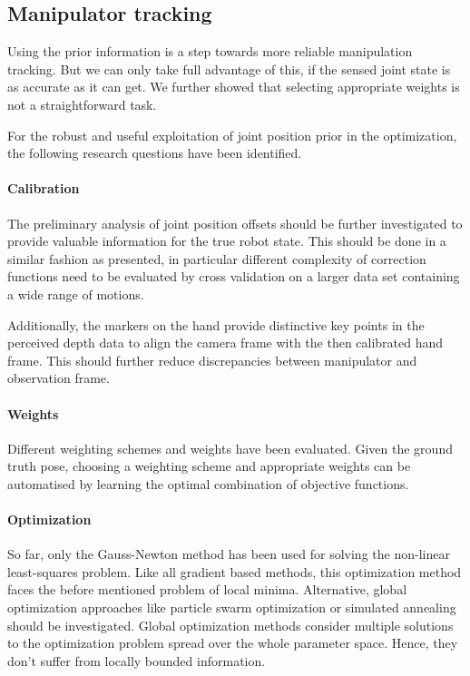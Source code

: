 \subsection{Manipulator tracking}

Using the prior information is a step towards more reliable manipulation tracking. But we can only take full advantage of this, if the sensed joint state is as accurate as it can get. We further showed that selecting appropriate weights is not a straightforward task.

For the robust and useful exploitation of joint position prior in the optimization, the following research questions have been identified.

\paragraph{Calibration}
The preliminary analysis of joint position offsets should be further investigated to provide valuable information for the true robot state. This should be done in a similar fashion as presented, in particular different complexity of correction functions need to be evaluated by cross validation on a larger data set containing a wide range of motions.

Additionally, the markers on the hand provide distinctive key points in the perceived depth data to align the camera frame with the then calibrated hand frame. This should further reduce discrepancies between manipulator and observation frame.

\paragraph{Weights}
Different weighting schemes and weights have been evaluated. Given the ground truth pose, choosing a weighting scheme and appropriate weights can be automatised by learning the optimal combination of objective functions.

\paragraph{Optimization}
So far, only the Gauss-Newton method has been used for solving the non-linear least-squares problem. Like all gradient based methods, this optimization method faces the before mentioned problem of local minima. Alternative, global optimization approaches like particle swarm optimization or simulated annealing should be investigated. Global optimization methods consider multiple solutions to the optimization problem spread over the whole parameter space. Hence, they don't suffer from locally bounded information.


